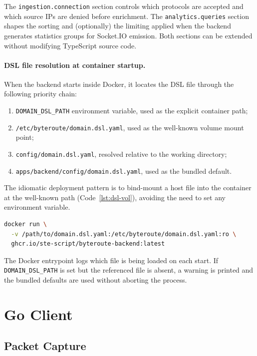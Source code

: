 \documentclass[12pt]{report}
\begin{document}
The \texttt{ingestion.connection} section controls which protocols are accepted
and which source IPs are denied before enrichment. The
\texttt{analytics.queries} section shapes the sorting and (optionally) the
limiting applied when the backend generates statistics groups for Socket.IO
emission. Both sections can be extended without modifying TypeScript source
code.

\paragraph{DSL file resolution at container startup.}
When the backend starts inside Docker, it locates the DSL file through the
following priority chain:

\begin{enumerate}
  \item \texttt{DOMAIN\_DSL\_PATH} environment variable, used as the explicit container path;
  \item \texttt{/etc/byteroute/domain.dsl.yaml}, used as the well-known volume mount point;
  \item \texttt{config/domain.dsl.yaml}, resolved relative to the working directory;
  \item \texttt{apps/backend/config/domain.dsl.yaml}, used as the bundled default.
\end{enumerate}

The idiomatic deployment pattern is to bind-mount a host file into the container
at the well-known path (Code~\ref{lst:dsl-vol}), avoiding the need to set any
environment variable.

\begin{lstlisting}[language=bash, caption={Injecting a custom domain DSL via volume mount.}, label={lst:dsl-vol}]
docker run \
  -v /path/to/domain.dsl.yaml:/etc/byteroute/domain.dsl.yaml:ro \
  ghcr.io/ste-script/byteroute-backend:latest
\end{lstlisting}

The Docker entrypoint logs which file is being loaded on each start. If
\texttt{DOMAIN\_DSL\_PATH} is set but the referenced file is absent, a warning
is printed and the bundled defaults are used without aborting the process.

\newpage
\section{Go Client}

\subsection{Packet Capture}
\end{document}
